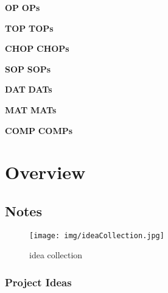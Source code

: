 
\def\boldcommandlist{\@elt OP,\@elt OPs,}
\def\@elt#1,{%
 \expandafter\def\csname#1\endcsname{\textbf{#1}\xspace}
}
\boldcommandlist

\def\topColorList{\@elt TOP,\@elt TOPs,}
\def\@elt#1,{%
 \expandafter\def\csname#1\endcsname{\textcolor{TOP}{\textbf{#1}}\xspace}
}
\topColorList

\def\chopColorList{\@elt CHOP,\@elt CHOPs,}
\def\@elt#1,{%
 \expandafter\def\csname#1\endcsname{\textcolor{CHOP}{\textbf{#1}}\xspace}
}
\chopColorList

\def\sopColorList{\@elt SOP,\@elt SOPs,}
\def\@elt#1,{%
 \expandafter\def\csname#1\endcsname{\textcolor{SOP}{\textbf{#1}}\xspace}
}
\sopColorList

\def\datColorList{\@elt DAT,\@elt DATs,}
\def\@elt#1,{%
 \expandafter\def\csname#1\endcsname{\textcolor{DAT}{\textbf{#1}}\xspace}
}
\datColorList

\def\matColorList{\@elt MAT,\@elt MATs,}
\def\@elt#1,{%
 \expandafter\def\csname#1\endcsname{\textcolor{MAT}{\textbf{#1}}\xspace}
}
\matColorList


\def\compColorList{\@elt COMP,\@elt COMPs,}
\def\@elt#1,{%
 \expandafter\def\csname#1\endcsname{\textcolor{COMP}{\textbf{#1}}\xspace}
}
\compColorList





\chapter{Overview}

\section{Notes} %
\label{notes}


\begin{figure}[h]
	\begin{center}
		\texttt{[image: img/ideaCollection.jpg]}
		\caption{idea collection}
		\label{fig:ideas}
	\end{center}
\end{figure}


\subsection{Project Ideas}
\label{sub:ideen}
